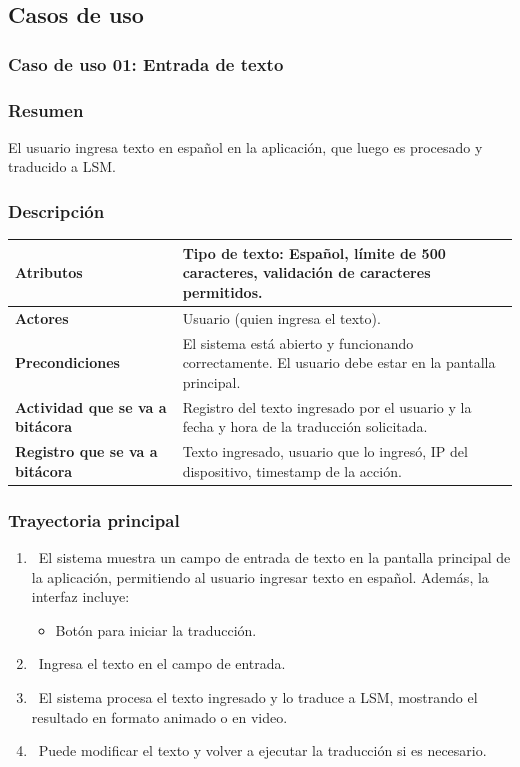 \subsection{Casos de uso}
\subsubsection{Caso de uso 01: Entrada de texto}
\subsubsection{Resumen}
El usuario ingresa texto en español en la aplicación, que luego es procesado y traducido a LSM.
\subsubsection{Descripción}

\noindent
\begin{tabularx}{\textwidth}{|l|X|}
\hline
\textbf{Atributos} & Tipo de texto: Español, límite de 500 caracteres, validación de caracteres permitidos. \\ \hline
\textbf{Actores} & Usuario (quien ingresa el texto). \\ \hline
\textbf{Precondiciones} & El sistema está abierto y funcionando correctamente. El usuario debe estar en la pantalla principal. \\ \hline
\textbf{Actividad que se va a bitácora} & Registro del texto ingresado por el usuario y la fecha y hora de la traducción solicitada. \\ \hline
\textbf{Registro que se va a bitácora} & Texto ingresado, usuario que lo ingresó, IP del dispositivo, timestamp de la acción. \\ \hline
\end{tabularx}

    

\subsubsection{Trayectoria principal}
\begin{enumerate}[label=\textbf{\arabic*}, leftmargin=1.5cm]
    \item \UCsystem \ El sistema muestra un campo de entrada de texto en la pantalla principal de la aplicación, permitiendo al usuario ingresar texto en español.  
    Además, la interfaz incluye:  
    \begin{itemize}
        \item Botón para iniciar la traducción.
    \end{itemize}

    \item \UCactor \ Ingresa el texto en el campo de entrada.  
   
    \item \UCsystem \ El sistema procesa el texto ingresado y lo traduce a LSM, mostrando el resultado en formato animado o en video.

    \item \UCactor \ Puede modificar el texto y volver a ejecutar la traducción si es necesario.

\end{enumerate}

